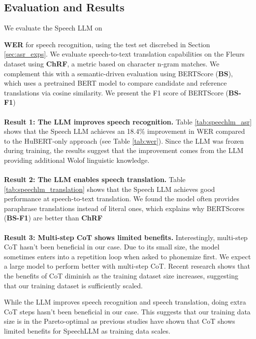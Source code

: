 \documentclass{article}
\newcommand{\myparagraph}[1]{\noindent\textbf{#1}}
\begin{document}
\subsection{Evaluation and Results}
We evaluate the Speech LLM on {\textbf{WER} for speech recognition, using the test set discrebed in Section \ref{sec:asr_exps}. We evaluate speech-to-text translation capabilities on the Fleurs \cite{fleurs} dataset using \textbf{ChRF}, a metric based on character n-gram matches. We complement this with a semantic-driven evaluation using BERTScore (\textbf{BS}), which uses a pretrained BERT model to compare candidate and reference translations via cosine similarity. We present the F1 score of BERTScore (\textbf{BS-F1})
\\
\\
\myparagraph{Result 1: The LLM improves speech recognition.} Table \ref{tab:speechlm_asr} shows that the Speech LLM achieves an 18.4\% improvement in WER compared to the HuBERT-only approach (see Table \ref{tab:wer}). Since the LLM was frozen during training, the results suggest that the improvement comes from the LLM providing additional Wolof linguistic knowledge.
\\
\\
\myparagraph{Result 2: The LLM enables speech translation.} Table \ref{tab:speechlm_translation} shows that the Speech LLM achieves good performance at speech-to-text translation. We found the model often provides paraphrase translations instead of literal ones, which explains why BERTScores (\textbf{BS-F1}) are better than \textbf{ChRF}
\\
\\
\myparagraph{Result 3: Multi-step CoT shows limited benefits.} Interestingly, multi-step CoT hasn't been beneficial in our case. Due to its small size, the model sometimes enters into a repetition loop when asked to phonemize first. We expect a large model to perform better with multi-step CoT. Recent research \cite{pareras2025revisitingdirectspeechtotexttranslation} shows that the benefits of CoT diminish as the training dataset size increases, suggesting that our training dataset is sufficiently scaled.

\begin{tcolorbox}[colback=violet!15!white,colframe=violet!100!white,title={\color{black} \textbf{Insight 3}: Multi-step CoT doesn't show benefits} ]
While the LLM improves speech recognition and speech translation, doing extra CoT steps hasn't been beneficial in our case. This suggests that our training data size is in the Pareto-optimal as previous studies have shown that CoT shows limited benefits for SpeechLLM as training data scales.
\end{tcolorbox}

}
\end{document}
